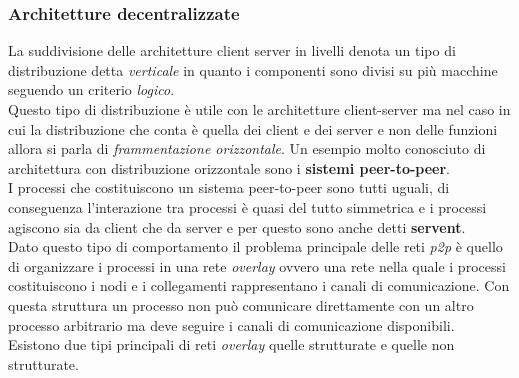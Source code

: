 \subsubsection{Architetture decentralizzate}
La suddivisione delle architetture client server in livelli denota un tipo di distribuzione detta \emph{verticale} in quanto i componenti sono divisi su più macchine seguendo un criterio \emph{logico}.\\
Questo tipo di distribuzione è utile con le architetture client-server ma nel caso in cui la distribuzione che conta è quella dei client e dei server e non delle funzioni allora si parla di \emph{frammentazione orizzontale}. Un esempio molto conosciuto di architettura con distribuzione orizzontale sono i \textbf{sistemi peer-to-peer}.\\
I processi che costituiscono un sistema peer-to-peer sono tutti uguali, di conseguenza l'interazione tra processi è quasi del tutto simmetrica e i processi agiscono sia da client che da server e per questo sono anche detti \textbf{servent}.\\
Dato questo tipo di comportamento il problema principale delle reti \emph{p2p} è quello di organizzare i processi in una rete \emph{overlay} ovvero una rete nella quale i processi costituiscono i nodi e i collegamenti rappresentano i canali di comunicazione. Con questa struttura un processo non può comunicare direttamente con un altro processo arbitrario ma deve seguire i canali di comunicazione disponibili.\\
Esistono due tipi principali di reti \emph{overlay} quelle strutturate e quelle non strutturate.
